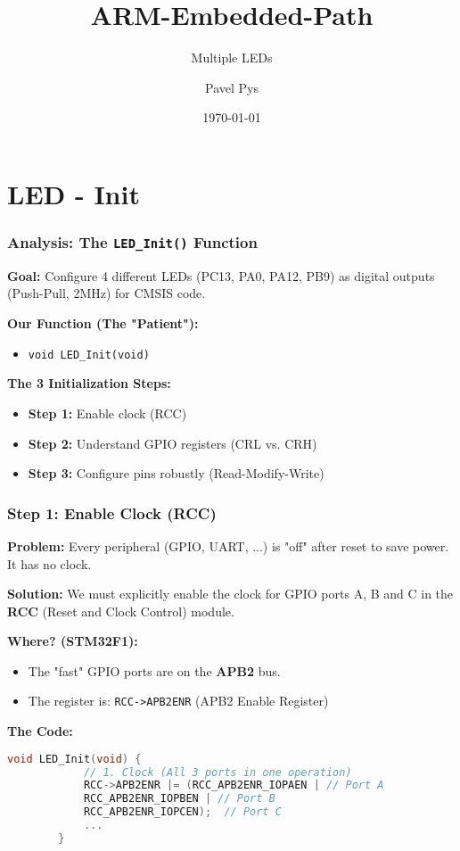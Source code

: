 \documentclass{beamer}
\title{ARM-Embedded-Path}
\subtitle{Multiple LEDs}
\author{Pavel Pys}
\date{\today}
\begin{document}
\begin{frame}{}
	\maketitle
\end{frame}
\section{LED - Init}
\begin{frame}
	\frametitle{Analysis: The \texttt{LED\_Init()} Function}
	\textbf{Goal:} Configure 4 different LEDs (PC13, PA0, PA12, PB9) as
	digital outputs (Push-Pull, 2MHz) for CMSIS code.
	
	\bigskip
	\textbf{Our Function (The "Patient"):}
	\begin{itemize}
		\item \texttt{void LED\_Init(void)}
	\end{itemize}
	
	\bigskip
	\textbf{The 3 Initialization Steps:}
	\begin{itemize}
		\item \textbf{Step 1:} Enable clock (RCC)
		\item \textbf{Step 2:} Understand GPIO registers (CRL vs. CRH)
		\item \textbf{Step 3:} Configure pins robustly (Read-Modify-Write)
	\end{itemize}
\end{frame}


\begin{frame}[fragile]
	\frametitle{Step 1: Enable Clock (RCC)}
	\textbf{Problem:} Every peripheral (GPIO, UART, ...) is "off" after reset 
	to save power. It has no clock.
	
	\medskip
	\textbf{Solution:} We must explicitly enable the clock for GPIO ports A, B and C
	in the \textbf{RCC} (Reset and Clock Control) module.
	
	\bigskip
	\textbf{Where? (STM32F1):}
	\begin{itemize}
		\item The "fast" GPIO ports are on the \textbf{APB2} bus.
		\item The register is: \texttt{RCC->APB2ENR} (APB2 Enable Register)
	\end{itemize}
	\textbf{The Code:}
	\begin{lstlisting}[language=C, style=mystyle,basicstyle=\scriptsize]
		void LED_Init(void) {
			// 1. Clock (All 3 ports in one operation)
			RCC->APB2ENR |= (RCC_APB2ENR_IOPAEN | // Port A
			RCC_APB2ENR_IOPBEN | // Port B
			RCC_APB2ENR_IOPCEN);  // Port C
			...
		}
	\end{lstlisting}
\end{frame}
\end{document}
